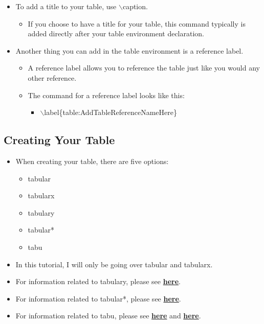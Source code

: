 \documentclass{article}
\begin{document}
\begin{itemize}
					\item To add a title to your table, use $\backslash$caption.
					\begin{itemize}
						\item If you choose to have a title for your table, this command typically is added directly after your table environment declaration.
					\end{itemize}
					\item Another thing you can add in the table environment is a reference label.
					\begin{itemize}
						\item A reference label allows you to reference the table just like you would any other reference.
						\item The command for a reference label looks like this:
						\begin{itemize}
							\item $\backslash$label\{table:AddTableReferenceNameHere\}
						\end{itemize}
					\end{itemize}
				\end{itemize}
		
		\subsection{Creating Your Table}
			\begin{itemize}
				\item When creating your table, there are five options:
				\begin{itemize}
					\item tabular
					\item tabularx
					\item tabulary
					\item tabular*
					\item tabu
				\end{itemize}
				\item In this tutorial, I will only be going over tabular and tabularx.
				\item For information related to tabulary, please see \href{https://en.wikibooks.org/wiki/LaTeX/Tables#The_tabular*_environment}{\textbf{here}}.
				\item For information related to tabular*, please see \href{https://en.wikibooks.org/wiki/LaTeX/Tables#The_tabular*_environment}{\textbf{here}}.		
				\item For information related to tabu, please see \href{https://en.wikibooks.org/wiki/LaTeX/Tables#The_tabu_environment}{\textbf{here}} and \href{http://mirrors.ibiblio.org/CTAN/macros/latex/contrib/tabu/tabu.pdf}{\textbf{here}}.
			\end{itemize}
			
\end{document}
